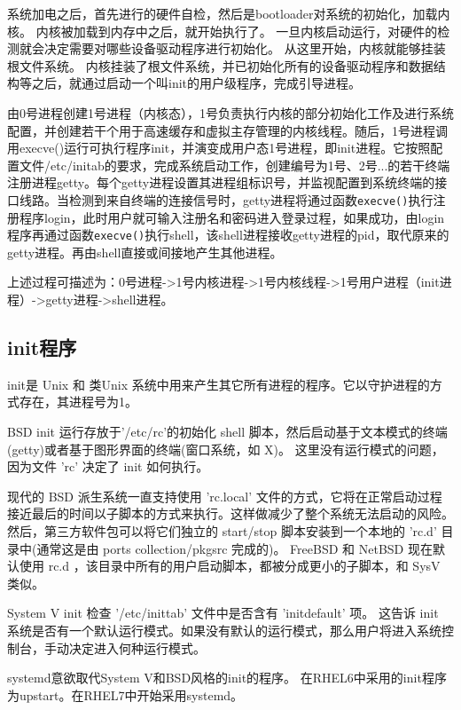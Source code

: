 系统加电之后，首先进行的硬件自检，然后是bootloader对系统的初始化，加载内核。
内核被加载到内存中之后，就开始执行了。
一旦内核启动运行，对硬件的检测就会决定需要对哪些设备驱动程序进行初始化。
从这里开始，内核就能够挂装根文件系统。
内核挂装了根文件系统，并已初始化所有的设备驱动程序和数据结构等之后，就通过启动一个叫init的用户级程序，完成引导进程。

由0号进程创建1号进程（内核态），1号负责执行内核的部分初始化工作及进行系统配置，并创建若干个用于高速缓存和虚拟主存管理的内核线程。随后，1号进程调用execve()运行可执行程序init，并演变成用户态1号进程，即init进程。它按照配置文件/etc/initab的要求，完成系统启动工作，创建编号为1号、2号...的若干终端注册进程getty。每个getty进程设置其进程组标识号，并监视配置到系统终端的接口线路。当检测到来自终端的连接信号时，getty进程将通过函数\verb$execve()$执行注册程序login，此时用户就可输入注册名和密码进入登录过程，如果成功，由login程序再通过函数\verb$execve()$执行shell，该shell进程接收getty进程的pid，取代原来的getty进程。再由shell直接或间接地产生其他进程。

上述过程可描述为：0号进程->1号内核进程->1号内核线程->1号用户进程（init进程）->getty进程->shell进程。


\subsection{init程序}

init是 Unix 和 类Unix 系统中用来产生其它所有进程的程序。它以守护进程的方式存在，其进程号为1。

BSD init 运行存放于'/etc/rc'的初始化 shell 脚本，然后启动基于文本模式的终端(getty)或者基于图形界面的终端(窗口系统，如 X)。
这里没有运行模式的问题，因为文件 'rc' 决定了 init 如何执行。

现代的 BSD 派生系统一直支持使用 'rc.local'
文件的方式，它将在正常启动过程接近最后的时间以子脚本的方式来执行。这样做减少了整个系统无法启动的风险。然后，第三方软件包可以将它们独立的 start/stop 脚本安装到一个本地的 'rc.d' 目录中(通常这是由 ports collection/pkgsrc 完成的)。 FreeBSD 和 NetBSD 现在默认使用 rc.d ，该目录中所有的用户启动脚本，都被分成更小的子脚本，和 SysV 类似。

System V init 检查 '/etc/inittab' 文件中是否含有 'initdefault' 项。 这告诉 init
系统是否有一个默认运行模式。如果没有默认的运行模式，那么用户将进入系统控制台，手动决定进入何种运行模式。

systemd意欲取代System V和BSD风格的init的程序。
在RHEL6中采用的init程序为upstart。在RHEL7中开始采用systemd。

   
